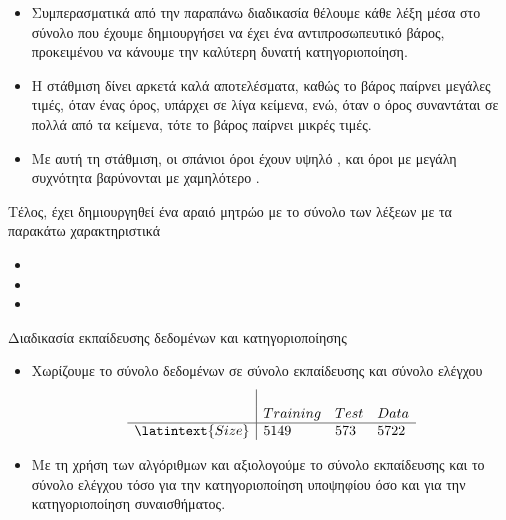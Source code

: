 \documentclass{beamer}
\begin{document}
\begin{frame}
\begin{itemize}
\item Συμπερασματικά από την παραπάνω διαδικασία θέλουμε κάθε λέξη μέσα στο σύνολο που έχουμε δημιουργήσει να έχει ένα αντιπροσωπευτικό βάρος, προκειμένου να κάνουμε την καλύτερη δυνατή κατηγοριοποίηση.
\item Η στάθμιση {} δίνει αρκετά καλά αποτελέσματα, καθώς το βάρος {} παίρνει μεγάλες τιμές, όταν ένας όρος, υπάρχει σε λίγα κείμενα, ενώ, όταν ο όρος συναντάται σε πολλά από τα κείμενα, τότε το βάρος {} παίρνει μικρές τιμές. \item Με αυτή τη στάθμιση, οι σπάνιοι όροι έχουν υψηλό {}, και όροι με μεγάλη συχνότητα βαρύνονται με χαμηλότερο {}.
\end{itemize}
\vfill
\item Τέλος, έχει δημιουργηθεί ένα αραιό μητρώο με το σύνολο των λέξεων με τα παρακάτω χαρακτηριστικά
\vfill
\begin{itemize}
\item {}
\item {}
\item {}
\end{itemize}
\end{frame}

\begin{frame}
\begin{flushleft}
{\color{blue}Διαδικασία εκπαίδευσης δεδομένων και κατηγοριοποίησης} 
\end{flushleft}
\vfill
\begin{itemize}
\item Χωρίζουμε το σύνολο δεδομένων σε σύνολο εκπαίδευσης και σύνολο ελέγχου
\[
\left. {\begin{array}{l|lll}\\
 &Training & Test & Data \\
\hline
{\latintext{Size}} & 5149 & 573 & 5722 \\
\end{array} } \right.
\]
\item Με τη χρήση των αλγόριθμων {} και {} αξιολογούμε το σύνολο εκπαίδευσης και το σύνολο ελέγχου τόσο για την κατηγοριοποίηση υποψηφίου όσο και για την κατηγοριοποίηση συναισθήματος.
\end{itemize}
\end{frame}
\end{document}
